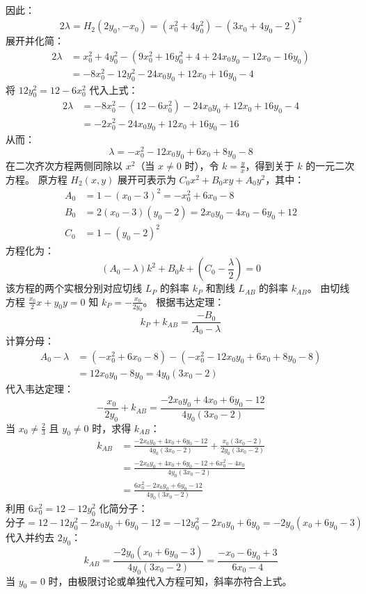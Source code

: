 \begin{solution}
因此：
\[ 2\lambda = H_2(2y_0, -x_0) = (x_0^2 + 4y_0^2) - (3x_0 + 4y_0 - 2)^2 \]
展开并化简：
\begin{align*}
2\lambda &= x_0^2 + 4y_0^2 - (9x_0^2 + 16y_0^2 + 4 + 24x_0 y_0 - 12x_0 - 16y_0) \\
&= -8x_0^2 - 12y_0^2 - 24x_0 y_0 + 12x_0 + 16y_0 - 4
\end{align*}
将 $12y_0^2 = 12 - 6x_0^2$ 代入上式：
\begin{align*}
2\lambda &= -8x_0^2 - (12 - 6x_0^2) - 24x_0 y_0 + 12x_0 + 16y_0 - 4 \\
&= -2x_0^2 - 24x_0 y_0 + 12x_0 + 16y_0 - 16
\end{align*}
从而：
\[ \lambda = -x_0^2 - 12x_0 y_0 + 6x_0 + 8y_0 - 8 \]
在二次齐次方程两侧同除以 $x^2$（当 $x \neq 0$ 时），令 $k = \frac{y}{x}$，得到关于 $k$ 的一元二次方程。
原方程 $H_2(x,y)$ 展开可表示为 $C_0 x^2 + B_0 xy + A_0 y^2$，其中：
\begin{align*}
A_0 &= 1 - (x_0 - 3)^2 = -x_0^2 + 6x_0 - 8 \\
B_0 &= 2(x_0 - 3)(y_0 - 2) = 2x_0 y_0 - 4x_0 - 6y_0 + 12 \\
C_0 &= 1 - (y_0 - 2)^2
\end{align*}
方程化为：
\[ (A_0 - \lambda)k^2 + B_0 k + \left(C_0 - \frac{\lambda}{2}\right) = 0 \]
该方程的两个实根分别对应切线 $L_P$ 的斜率 $k_P$ 和割线 $L_{AB}$ 的斜率 $k_{AB}$。
由切线方程 $\frac{x_0}{2}x + y_0 y = 0$ 知 $k_P = -\frac{x_0}{2y_0}$。
根据韦达定理：
\[ k_P + k_{AB} = \frac{-B_0}{A_0 - \lambda} \]
计算分母：
\begin{align*}
A_0 - \lambda &= (-x_0^2 + 6x_0 - 8) - (-x_0^2 - 12x_0 y_0 + 6x_0 + 8y_0 - 8) \\
&= 12x_0 y_0 - 8y_0 = 4y_0(3x_0 - 2)
\end{align*}
代入韦达定理：
\[ -\frac{x_0}{2y_0} + k_{AB} = \frac{-2x_0 y_0 + 4x_0 + 6y_0 - 12}{4y_0(3x_0 - 2)} \]
当 $x_0 \neq \frac{2}{3}$ 且 $y_0 \neq 0$ 时，求得 $k_{AB}$：
\begin{align*}
k_{AB} &= \frac{-2x_0 y_0 + 4x_0 + 6y_0 - 12}{4y_0(3x_0 - 2)} + \frac{x_0(3x_0 - 2)}{2y_0(3x_0 - 2)} \\
&= \frac{-2x_0 y_0 + 4x_0 + 6y_0 - 12 + 6x_0^2 - 4x_0}{4y_0(3x_0 - 2)} \\
&= \frac{6x_0^2 - 2x_0 y_0 + 6y_0 - 12}{4y_0(3x_0 - 2)}
\end{align*}
利用 $6x_0^2 = 12 - 12y_0^2$ 化简分子：
\[ \text{分子} = 12 - 12y_0^2 - 2x_0 y_0 + 6y_0 - 12 = -12y_0^2 - 2x_0 y_0 + 6y_0 = -2y_0(x_0 + 6y_0 - 3) \]
代入并约去 $2y_0$：
\[ k_{AB} = \frac{-2y_0(x_0 + 6y_0 - 3)}{4y_0(3x_0 - 2)} = \frac{-x_0 - 6y_0 + 3}{6x_0 - 4} \]
当 $y_0 = 0$ 时，由极限讨论或单独代入方程可知，斜率亦符合上式。


\end{solution}
